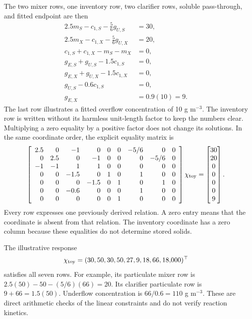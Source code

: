 The two mixer rows, one inventory row, two clarifier rows, soluble pass-through, and fitted endpoint are then
\begin{align}
2.5m_S-c_{1,S}-\tfrac56g_{U,S}&=30,\\
2.5m_X-c_{1,X}-\tfrac56g_{U,X}&=20,\\
c_{1,S}+c_{1,X}-m_S-m_X&=0,\\
g_{E,S}+g_{U,S}-1.5c_{1,S}&=0,\\
g_{E,X}+g_{U,X}-1.5c_{1,X}&=0,\\
g_{U,S}-0.6c_{1,S}&=0,\\
g_{E,X}&=0.9(10)=9.
\end{align}
The last row illustrates a fitted overflow concentration of 10 g m$^{-3}$. The inventory row is written without its harmless unit-length factor to keep the numbers clear. Multiplying a zero equality by a positive factor does not change its solutions. In the same coordinate order, the explicit equality matrix is
\begin{equation}
\left[\begin{array}{rrrrrrrrr}
2.5&0&-1&0&0&0&-5/6&0&0\\
0&2.5&0&-1&0&0&0&-5/6&0\\
-1&-1&1&1&0&0&0&0&0\\
0&0&-1.5&0&1&0&1&0&0\\
0&0&0&-1.5&0&1&0&1&0\\
0&0&-0.6&0&0&0&1&0&0\\
0&0&0&0&0&1&0&0&0
\end{array}\right]\chi_{\rm toy}
=\begin{bmatrix}30\\20\\0\\0\\0\\0\\9\end{bmatrix}.
\end{equation}
Every row expresses one previously derived relation. A zero entry means that the coordinate is absent from that relation. The inventory coordinate has a zero column because these equalities do not determine stored solids.

The illustrative response
\begin{equation}
\chi_{\rm toy}=(30,50,30,50,27,9,18,66,18{,}000)^\top
\end{equation}
satisfies all seven rows. For example, its particulate mixer row is $2.5(50)-50-(5/6)(66)=20$. Its clarifier particulate row is $9+66=1.5(50)$. Underflow concentration is $66/0.6=110$ g m$^{-3}$. These are direct arithmetic checks of the linear constraints and do not verify reaction kinetics.

